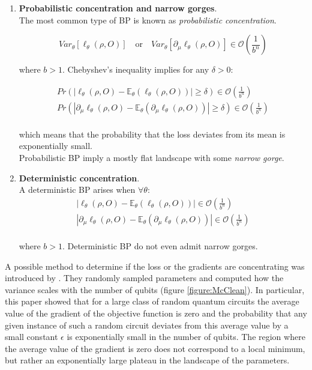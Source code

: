 \begin{enumerate}
    \item \textbf{Probabilistic concentration and narrow gorges}.\\
    The most common type of BP is known as \textit{probabilistic concentration}.

    \begin{equation}
        Var_{\theta} [ \ell_{\theta}(\rho, O) ] \quad \text{or} \quad Var_{\theta} [ \partial_{\mu} \ell_{\theta}(\rho, O) ] \in \mathcal{O}(\frac{1}{b^n})
    \end{equation}

    where $b > 1$. Chebyshev's inequality implies for any $\delta > 0$:

    \begin{align}
        Pr(|\ell_{\theta}(\rho, O) - \mathbb{E}_{\theta}(\ell_{\theta}(\rho, O))| \ge \delta) \in \mathcal{O}(\frac{1}{b^n})\\
        Pr(|\partial_{\mu} \ell_{\theta}(\rho, O) - \mathbb{E}_{\theta}(\partial_{\mu} \ell_{\theta}(\rho, O))| \ge \delta) \in \mathcal{O}(\frac{1}{b^n})\\
    \end{align}

    which means that the probability that the loss deviates from its mean is exponentially small.\\
    Probabilistic BP imply a mostly flat landscape with some \textit{narrow gorge}.
    
    \item \textbf{Deterministic concentration}.\\
    A deterministic BP arises when $\forall \theta$:
    \begin{align}
        |\ell_{\theta}(\rho, O) - \mathbb{E}_{\theta}(\ell_{\theta}(\rho, O))| \in \mathcal{O}(\frac{1}{b^n})\\
        |\partial_{\mu} \ell_{\theta}(\rho, O) - \mathbb{E}_{\theta}(\partial_{\mu} \ell_{\theta}(\rho, O))| \in \mathcal{O}(\frac{1}{b^n})\\
    \end{align}

    where $b > 1$.
    Deterministic BP do not even admit narrow gorges.
\end{enumerate}


A possible method to determine if the loss or the gradients are concentrating was introduced by \cite{McClean_2018}.
They randomly sampled parameters and computed how the variance scales with the number of qubits 
(figure \ref{figure:McClean}).
In particular, this paper showed that for a large class of random quantum circuits the average value of the gradient of the objective 
function is zero and the probability that any given instance of such a random circuit deviates from this average 
value by a small constant $\epsilon$ is exponentially small in the number of qubits.
The region where the average value of the gradient is zero does not correspond to a local minimum, but rather an 
exponentially large plateau in the landscape of the parameters.\\

